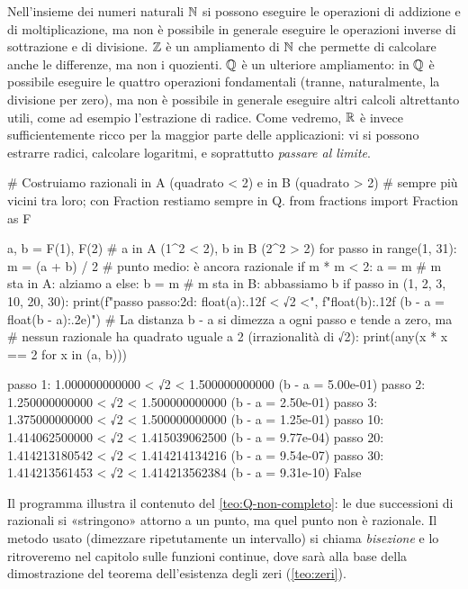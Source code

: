 \begin{idea}
Nell'insieme dei numeri naturali $\mathbb{N}$ si possono eseguire le operazioni di addizione e di
moltiplicazione, ma non è possibile in generale eseguire le operazioni inverse di
sottrazione e di divisione. $\mathbb{Z}$ è un ampliamento di $\mathbb{N}$ che permette di calcolare
anche le differenze, ma non i quozienti. $\mathbb{Q}$ è un ulteriore ampliamento: in $\mathbb{Q}$ è
possibile eseguire le quattro operazioni fondamentali (tranne, naturalmente, la
divisione per zero), ma non è possibile in generale eseguire altri calcoli altrettanto
utili, come ad esempio l'estrazione di radice. Come vedremo, $\mathbb{R}$ è invece
sufficientemente ricco per la maggior parte delle applicazioni: vi si possono
estrarre radici, calcolare logaritmi, e soprattutto \emph{passare al limite}.
\end{idea}

\begin{python}
# Costruiamo razionali in A (quadrato < 2) e in B (quadrato > 2)
# sempre più vicini tra loro; con Fraction restiamo sempre in Q.
from fractions import Fraction as F

a, b = F(1), F(2)              # a in A (1^2 < 2), b in B (2^2 > 2)
for passo in range(1, 31):
    m = (a + b) / 2            # punto medio: è ancora razionale
    if m * m < 2:
        a = m                  # m sta in A: alziamo a
    else:
        b = m                  # m sta in B: abbassiamo b
    if passo in (1, 2, 3, 10, 20, 30):
        print(f"passo {passo:2d}: {float(a):.12f} < √2 <",
              f"{float(b):.12f}   (b - a = {float(b - a):.2e})")
# La distanza b - a si dimezza a ogni passo e tende a zero, ma
# nessun razionale ha quadrato uguale a 2 (irrazionalità di √2):
print(any(x * x == 2 for x in (a, b)))
\end{python}
\begin{risultato}
passo  1: 1.000000000000 < √2 < 1.500000000000   (b - a = 5.00e-01)
passo  2: 1.250000000000 < √2 < 1.500000000000   (b - a = 2.50e-01)
passo  3: 1.375000000000 < √2 < 1.500000000000   (b - a = 1.25e-01)
passo 10: 1.414062500000 < √2 < 1.415039062500   (b - a = 9.77e-04)
passo 20: 1.414213180542 < √2 < 1.414214134216   (b - a = 9.54e-07)
passo 30: 1.414213561453 < √2 < 1.414213562384   (b - a = 9.31e-10)
False
\end{risultato}

Il programma illustra il contenuto del \cref{teo:Q-non-completo}: le due successioni di
razionali si «stringono» attorno a un punto, ma quel punto non è razionale. Il metodo
usato (dimezzare ripetutamente un intervallo) si chiama \emph{bisezione} e lo
ritroveremo nel capitolo sulle funzioni continue, dove sarà alla base della
dimostrazione del teorema dell'esistenza degli zeri (\cref{teo:zeri}).

